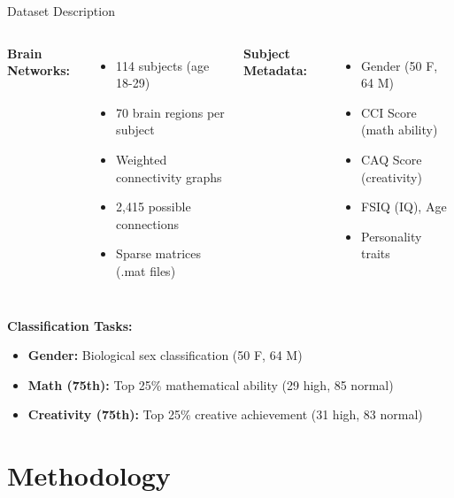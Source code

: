 \documentclass{beamer}
\begin{document}
\begin{frame}{Dataset Description}
\begin{columns}
\textbf{Brain Networks:}
\begin{itemize}
  \item 114 subjects (age 18-29)
  \item 70 brain regions per subject
  \item Weighted connectivity graphs
  \item 2,415 possible connections
  \item Sparse matrices (.mat files)
\end{itemize}

\textbf{Subject Metadata:}
\begin{itemize}
  \item Gender (50 F, 64 M)
  \item CCI Score (math ability)
  \item CAQ Score (creativity)
  \item FSIQ (IQ), Age
  \item Personality traits
\end{itemize}
\end{columns}

\vskip 0.3cm
\textbf{Classification Tasks:}
\begin{itemize}
  \item \textbf{Gender:} Biological sex classification (50 F, 64 M)
  \item \textbf{Math (75th):} Top 25\% mathematical ability (29 high, 85 normal)
  \item \textbf{Creativity (75th):} Top 25\% creative achievement (31 high, 83 normal)
\end{itemize}
\end{frame}

\section{Methodology}
\end{document}
